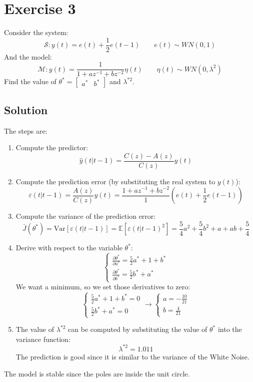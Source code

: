 \section{Exercise 3}

Consider the system: 
\[\mathcal{S}:y(t)=e(t)+\dfrac{1}{2}e(t-1)\qquad e(t)\sim WN(0,1)\]
And the model: 
\[\mathcal{M}:y(t)=\dfrac{1}{1+az^{-1}+bz^{-2}}\eta(t)\qquad \eta(t)\sim WN(0,\lambda^2)\]
Find the value of $\theta^\ast=\begin{bmatrix} a^\ast & b^\ast \end{bmatrix}$ and $\lambda^{\ast 2}$. 

\subsection*{Solution}
The steps are: 
\begin{enumerate}
    \item Compute the predictor:
        \[\hat{y}(t|t-1)=\dfrac{C(z)-A(z)}{C(z)}y(t)\]
    \item Compute the prediction error (by substituting the real system to $y(t)$): 
        \[\varepsilon(t|t-1)=\dfrac{A(z)}{C(z)}y(t)=\dfrac{1+az^{-1}+bz^{-2}}{1}\left(e(t)+\dfrac{1}{2}e(t-1)\right)\]
    \item Compute the variance of the prediction error:
        \[\bar{J}(\theta^{\ast})=\text{Var}\left[\varepsilon(t|t-1)\right]=\mathbb{E}\left[{\varepsilon(t|t-1)}^2\right]=\dfrac{5}{4}a^2+\dfrac{5}{4}b^2+a+ab+\dfrac{5}{4}\]
    \item Derive with respect to the variable $\theta^{\ast}$: 
        \[\begin{cases}
            \frac{\partial \theta^{\ast}}{\partial a^\ast} = \frac{5}{2}a^\ast+1+ b^\ast\\
            \frac{\partial \theta^{\ast}}{\partial b^\ast} = \frac{5}{2} b^\ast+a^\ast
        \end{cases}\]
        We want a minimum, so we set those derivatives to zero:
        \[\begin{cases}
            \frac{5}{2}a^\ast+1+ b^\ast=0\\
            \frac{5}{2} b^\ast+a^\ast=0
        \end{cases}\rightarrow \begin{cases}
            a=-\frac{10}{21} \\
            b=\frac{4}{21}
        \end{cases}\]
    \item The value of $\lambda^{\ast 2}$ can be computed by substituting the value of $\theta^\ast$ into the variance function: 
        \[\lambda^{\ast 2}=1.011\]
        The prediction is good since it is similar to the variance of the  White Noise. 
\end{enumerate}
The model is stable since the poles are inside the unit circle. 